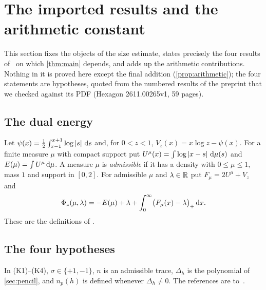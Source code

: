 \section{The imported results and the arithmetic constant}\label{sec:imported}

This section fixes the objects of the size estimate, states precisely the four results of~\Kri{}
on which \cref{thm:main} depends, and adds up the arithmetic contributions. Nothing in it is
proved here except the final addition (\cref{prop:arithmetic}); the four statements are
hypotheses, quoted from the numbered results of the preprint that we checked against its PDF
(Hexagon 2611.00265v1, 59 pages).

\subsection{The dual energy}\label{subsec:dual}

Let $\psi(x)=\frac12\int_{x-1}^{x+1}\log\left\lvert s\right\rvert\,\mathrm{d} s$ and, for $0<z<1$, $V_z(x)=x\log z-\psi(x)$. For a
finite measure $\mu$ with compact support put $U^\mu(x)=\int\log\left\lvert x-s\right\rvert\,\mathrm{d}\mu(s)$ and
$E(\mu)=\int U^\mu\,\mathrm{d}\mu$. A measure $\mu$ is \emph{admissible} if it has a density with
$0\le\mu\le1$, mass $1$ and support in $[0,2]$. For admissible $\mu$ and $\lambda\in\mathbb{R}$ put
$F_\mu=2U^\mu+V_z$ and
\begin{equation}\label{eq:Phi}
\Phi_z(\mu,\lambda)=-E(\mu)+\lambda+\int_0^\infty\bigl(F_\mu(x)-\lambda\bigr)_+\,\mathrm{d} x .
\end{equation}
These are the definitions of \cite[Section~5.1]{Krisman2026units}.

\subsection{The four hypotheses}\label{subsec:imported}

In (K1)--(K4), $\sigma\in\{+1,-1\}$, $n$ is an admissible trace, $\Delta_h$ is the polynomial of
\cref{sec:pencil}, and $n_p(h)$ is defined whenever $\Delta_h\ne0$. The references are to~\Kri.

